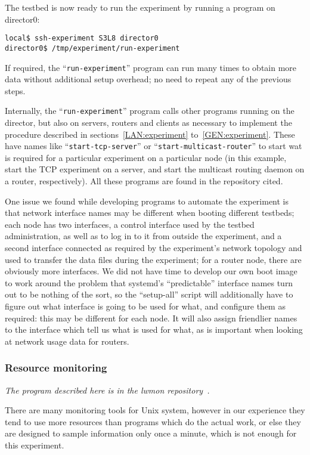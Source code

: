 \documentclass[a4paper,12pt]{article}
\begin{document}
The testbed is now ready to run the experiment by running a program on
director0:

\begin{verbatim}
local$ ssh-experiment S3L8 director0
director0$ /tmp/experiment/run-experiment
\end{verbatim}

If required, the ``{\tt run-experiment}'' program can run many times
to obtain more data without additional setup overhead; no need to
repeat any of the previous steps.

Internally, the ``{\tt run-experiment}'' program calls other programs
running on the director, but also on servers, routers and clients
as necessary to implement the procedure described in
sections~\ref{LAN:experiment} to~\ref{GEN:experiment}. These
have names like ``{\tt start-tcp-server}'' or
``{\tt start-multicast-router}'' to start wat is required for
a particular experiment on a particular node (in this example,
start the TCP experiment on a server, and start the multicast
routing daemon on a router, respectively).  All these programs are
found in the repository cited.

One issue we found while developing programs to automate the experiment
is that network interface names may be different when booting
different testbeds; each node has two interfaces, a control
interface used by the testbed administration, as well as to log
in to it from outside the experiment, and a second interface
connected as required by the experiment's network topology and
used to transfer the data files during the experiment; for a router
node, there are obviously more interfaces.  We did not have time
to develop our own boot image to work around the problem that
systemd's ``predictable'' interface names turn out to be nothing
of the sort, so the ``setup-all'' script will additionally have
to figure out what interface is going to be used for what, and
configure them as required: this may be different for each node.
It will also assign friendlier names to the interface which tell
us what is used for what, as is important when looking at network
usage data for routers.

\subsubsection{Resource monitoring}
{\em The program described here is in the lwmon repository~\cite{lwmon}.}

There are many monitoring tools for Unix system, however in our experience
they tend to use more resources than programs which do the actual work,
or else they are designed to sample information only once a minute,
which is not enough for this experiment.
\end{document}
